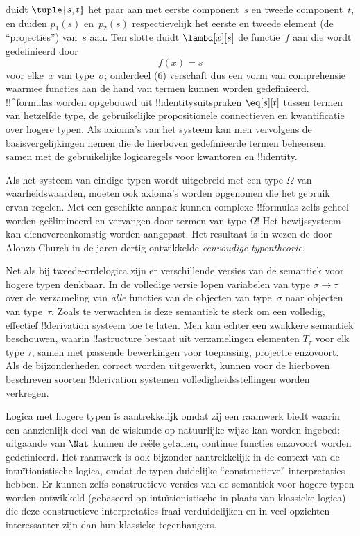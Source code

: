 \documentclass[../../../include/open-logic-section]{subfiles}
\begin{document}
duidt $\tuple{s, t}$ het paar aan met eerste component~$s$ en tweede
component~$t$, en duiden $p_1(s)$ en~$p_2(s)$ respectievelijk het eerste en
tweede element (de ``projecties'') van~$s$ aan. Ten slotte duidt
$\lambd[x][s]$ de functie~$f$ aan die wordt gedefinieerd door
\[
f(x) = s
\]
voor elke~$x$ van type~$\sigma$; onderdeel (6) verschaft dus een vorm van
comprehensie waarmee functies aan de hand van termen kunnen worden
gedefinieerd. !!^{formula}s worden opgebouwd uit !!{identity}suitspraken
$\eq[s][t]$ tussen termen van hetzelfde type, de gebruikelijke
propositionele connectieven en kwantificatie over hogere typen. Als axioma's
van het systeem kan men vervolgens de basisvergelijkingen nemen die de
hierboven gedefinieerde termen beheersen, samen met de gebruikelijke
logicaregels voor kwantoren en !!{identity}.

Als het systeem van eindige typen wordt uitgebreid met een type $\Omega$ van
waarheidswaarden, moeten ook axioma's worden opgenomen die het gebruik ervan
regelen. Met een geschikte aanpak kunnen complexe !!{formula}s zelfs geheel
worden geëlimineerd en vervangen door termen van type $\Omega$!{} Het
bewijssysteem kan dienovereenkomstig worden aangepast. Het resultaat is in
wezen de door Alonzo Church in de jaren dertig ontwikkelde
\emph{eenvoudige typentheorie}.

Net als bij tweede-ordelogica zijn er verschillende versies van de semantiek
voor hogere typen denkbaar. In de volledige versie lopen variabelen van type
$\sigma \to \tau$ over de verzameling van
\emph{alle} functies van de objecten van type~$\sigma$ naar objecten van
type~$\tau$. Zoals te verwachten is deze semantiek te sterk om een volledig,
effectief !!{derivation} systeem toe te laten. Men kan echter een zwakkere
semantiek beschouwen, waarin !!a{structure} bestaat uit verzamelingen elementen
$T_\tau$ voor elk type $\tau$, samen met passende bewerkingen voor toepassing,
projectie enzovoort. Als de bijzonderheden correct worden uitgewerkt, kunnen
voor de hierboven beschreven soorten !!{derivation} systemen
volledigheidsstellingen worden verkregen.

Logica met hogere typen is aantrekkelijk omdat zij een raamwerk biedt waarin
een aanzienlijk deel van de wiskunde op natuurlijke wijze kan worden
ingebed: uitgaande van $\Nat$ kunnen de reële getallen, continue functies
enzovoort worden gedefinieerd. Het raamwerk is ook bijzonder aantrekkelijk in
de context van de intuïtionistische logica, omdat de typen duidelijke
``constructieve'' interpretaties hebben. Er kunnen zelfs constructieve versies
van de semantiek voor hogere typen worden ontwikkeld (gebaseerd op
intuïtionistische in plaats van klassieke logica) die deze constructieve
interpretaties fraai verduidelijken en in veel opzichten interessanter zijn
dan hun klassieke tegenhangers.
\end{document}
